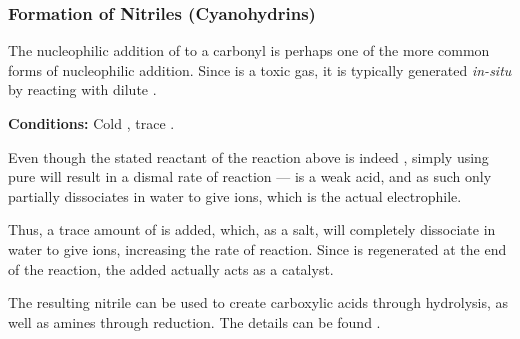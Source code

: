 			\subsubsection{Formation of Nitriles (Cyanohydrins)}

				The nucleophilic addition of  to a carbonyl is perhaps one of the more common forms of nucleophilic addition.
				Since  is a toxic gas, it is typically generated \textit{in-situ} by reacting  with dilute .


				\vspace{-5mm}


				\vspace{1.5em}
				\vbox{\textbf{Conditions:}	\tabto{35mm}Cold , trace .}


				Even though the stated reactant of the reaction above is indeed , simply using pure  will result in a dismal
				rate of reaction ---  is a weak acid, and as such only partially dissociates in water to give  ions, which is
				the actual electrophile.

				Thus, a trace amount of  is added, which, as a salt, will completely dissociate in water to give  ions,
				increasing the rate of reaction. Since  is regenerated at the end of the reaction, the  added actually
				acts as a catalyst.



				The resulting nitrile can be used to create carboxylic acids through hydrolysis, as well as amines through
				reduction. The details can be found \hyperlink{NitrileUses}{}.

